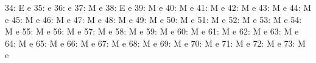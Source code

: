 \documentclass[nojss]{jss}
\begin{document}
\begin{Schunk}
\begin{Soutput}
 34:                                   E                        e
 35:                                                            e
 36:                                                            e
 37:                                   M                        e
 38:                                   E                        e
 39:                                   M                        e
 40:                                   M                        e
 41:                                   M                        e
 42:                                   M                        e
 43:                                   M                        e
 44:                                   M                        e
 45:                                   M                        e
 46:                                   M                        e
 47:                                   M                        e
 48:                                   M                        e
 49:                                   M                        e
 50:                                   M                        e
 51:                                   M                        e
 52:                                   M                        e
 53:                                   M                        e
 54:                                   M                        e
 55:                                   M                        e
 56:                                   M                        e
 57:                                   M                        e
 58:                                   M                        e
 59:                                   M                        e
 60:                                   M                        e
 61:                                   M                        e
 62:                                   M                        e
 63:                                   M                        e
 64:                                   M                        e
 65:                                   M                        e
 66:                                   M                        e
 67:                                   M                        e
 68:                                   M                        e
 69:                                   M                        e
 70:                                   M                        e
 71:                                   M                        e
 72:                                   M                        e
 73:                                   M                        e

\end{Soutput}
\end{Schunk}
\end{document}
